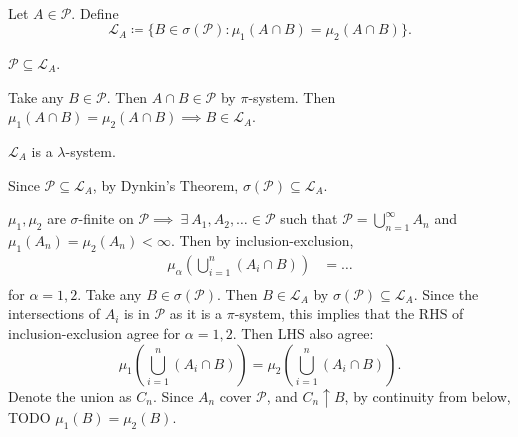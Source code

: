 \documentclass[class=article,crop=false]{standalone}
\begin{document}
~\begin{prf}
	Let $ A \in \mathcal{P}$. Define
\[
	\mathscr{L}_A \coloneqq \{B \in \sigma(\mathcal{P}): \mu_1(A \cap B) = \mu_2(A \cap B)\} 
.\] 
\begin{claim}[]
$ \mathcal{P} \subseteq \mathscr{L}_A$.
\end{claim}
Take any $ B \in \mathcal{P}$. Then $ A \cap B \in \mathcal{P}$ by $\pi$-system. Then $ \mu_1(A \cap B) = \mu_2(A \cap B) \implies B \in \mathscr{L}_A$.

\begin{claim}[]
$ \mathscr{L}_A$ is a $\lambda$-system.
\end{claim}
Since $ \mathcal{P} \subseteq \mathscr{L}_A$, by Dynkin's Theorem, $ \sigma(\mathcal{P}) \subseteq \mathscr{L}_A$.

	$ \mu_1,\mu_2$ are $ \sigma$-finite on $ \mathcal{P} \implies \ \exists \ A_1, A_2, \ldots \in \mathcal{P}$ such that $ \mathcal{P}=\bigcup_{ n =1}^{\infty} A_n$ and $ \mu_1(A_n)=\mu_2(A_n) < \infty$.
	Then by inclusion-exclusion,
	\begin{align*}
		\mu_{\alpha} \left( \bigcup_{ i= 1}^{ n} (A_i \cap B) \right) &= \ldots \\ 
	\end{align*}
	for $ \alpha=1,2$. Take any $ B \in \sigma(\mathcal{P})$. Then $ B \in \mathscr{L}_A$ by $ \sigma(\mathcal{P}) \subseteq \mathscr{L}_A$. Since the intersections of $ A_i$ is in $ \mathcal{P}$ as it is a $\pi$-system, this implies that the RHS of inclusion-exclusion agree for $ \alpha=1,2$. Then LHS also agree:
	\[
		\mu_1\left( \bigcup_{ i= 1}^{ n} (A_i \cap B) \right) = \mu_2\left( \bigcup_{ i= 1}^{ n} (A_i \cap B) \right) 
	.\] 
	Denote the union as $ C_n$. Since $ A_n$ cover $ \mathcal{P}$, and $ C_n \uparrow B$, by continuity from below, TODO $ \mu_1(B) = \mu_2(B)$.
\end{prf}
\end{document}
